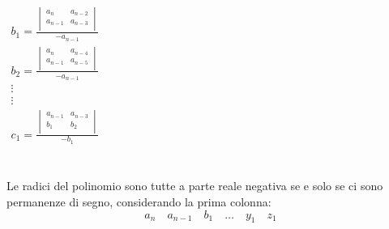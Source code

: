 \documentclass{report}
\theoremstyle{nostyle}
\begin{document}
            \begin{minipage}{0.38\textwidth}
            \begin{center}
                $\begin{array}{l}
                    b_{1} = \frac{
                    \begin{vmatrix}
                    a_{n} & a_{n-2} \\
                    a_{n-1} & a_{n-3} \\
                    \end{vmatrix}
                    }{-a_{n-1}} \\
                    
                    b_{2} = \frac{
                    \begin{vmatrix}
                    a_{n} & a_{n-4} \\
                    a_{n-1} & a_{n-5} \\
                    \end{vmatrix}
                    }{-a_{n-1}} \\
                    
                    \vdots \\
                    \vdots\\

                    c_{1} = \frac{
                    \begin{vmatrix}
                    a_{n-1} & a_{n-3} \\
                    b_{1} & b_{2} \\
                    \end{vmatrix}
                    }{-b_{1}} \\
                \end{array}$
            \end{center}
            \end{minipage}\bigskip\\


\noindent
Le radici del polinomio sono tutte a parte reale negativa se e solo se ci sono permanenze di segno, considerando la prima colonna:
$$a_n\quad a_{n-1}\quad b_1\quad \dots\quad y_1\quad z_1$$
\end{document}
